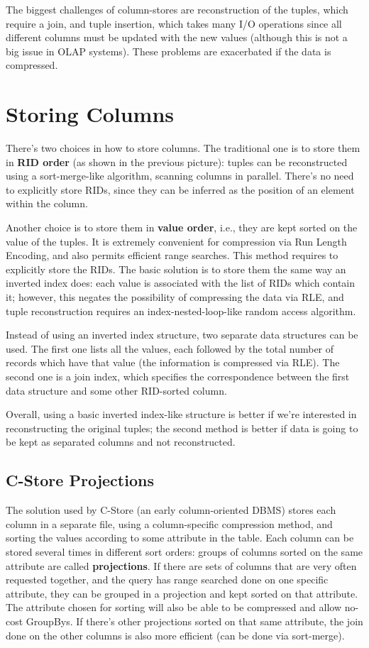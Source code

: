 The biggest challenges of column-stores are reconstruction of the tuples, which require a join, and tuple insertion, which takes many I/O operations since all different columns must be updated with the new values (although this is not a big issue in OLAP systems). These problems are exacerbated if the data is compressed.

\section{Storing Columns}

There's two choices in how to store columns. The traditional one is to store them in \textbf{RID order} (as shown in the previous picture): tuples can be reconstructed using a sort-merge-like algorithm, scanning columns in parallel. There's no need to explicitly store RIDs, since they can be inferred as the position of an element within the column.

Another choice is to store them in \textbf{value order}, i.e., they are kept sorted on the value of the tuples. It is extremely convenient for compression via Run Length Encoding, and also permits efficient range searches. This method requires to explicitly store the RIDs. The basic solution is to store them the same way an inverted index does: each value is associated with the list of RIDs which contain it; however, this negates the possibility of compressing the data via RLE, and tuple reconstruction requires an index-nested-loop-like random access algorithm.

Instead of using an inverted index structure, two separate data structures can be used. The first one lists all the values, each followed by the total number of records which have that value (the information is compressed via RLE). The second one is a join index, which specifies the correspondence between the first data structure and some other RID-sorted column.

Overall, using a basic inverted index-like structure is better if we're interested in reconstructing the original tuples; the second method is better if data is going to be kept as separated columns and not reconstructed.

\subsection{C-Store Projections}

The solution used by C-Store (an early column-oriented DBMS) stores each column in a separate file, using a column-specific compression method, and sorting the values according to some attribute in the table. Each column can be stored several times in different sort orders: groups of columns sorted on the same attribute are called \textbf{projections}. If there are sets of columns that are very often requested together, and the query has range searched done on one specific attribute, they can be grouped in a projection and kept sorted on that attribute. The attribute chosen for sorting will also be able to be compressed and allow no-cost GroupBys. If there's other projections sorted on that same attribute, the join done on the other columns is also more efficient (can be done via sort-merge).

